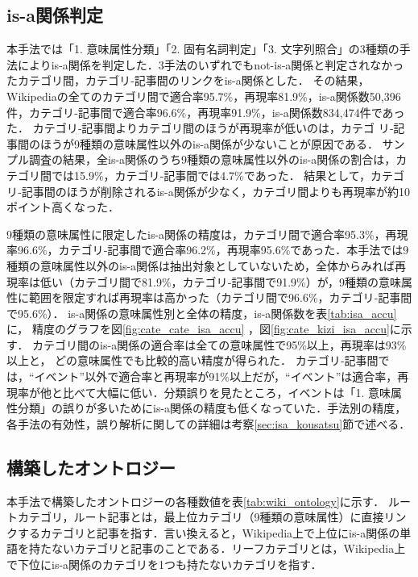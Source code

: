 \documentclass[japanese]{jnlp_1.4}
\begin{document}
\subsection{is-a関係判定}
\label{sec:isa_kekka}

本手法では「1. 意味属性分類」「2. 固有名詞判定」「3. 文字列照合」の3種類の手法によりis-a関係を判定した．3手法のいずれでもnot-is-a関係と判定されなかったカテゴリ間，カテゴリ‐記事間のリンクをis-a関係とした．
その結果，Wikipediaの全てのカテゴリ間で適合率95.7\%，再現率81.9\%，is-a関係数50,396件，カテゴリ‐記事間で適合率96.6\%，再現率91.9\%，is-a関係数834,474件であった．
カテゴリ‐記事間よりカテゴリ間のほうが再現率が低いのは，カテゴ\linebreak
リ‐記事間のほうが9種類の意味属性以外のis-a関係が少ないことが原因である．
サンプル調査の結果，全is-a関係のうち9種類の意味属性以外のis-a関係の割合は，カテゴリ間では15.9\%，カテゴリ‐記事間では4.7\%であった．
結果として，カテゴリ‐記事間のほうが削除されるis-a関係が少なく，カテゴリ間よりも再現率が約10ポイント高くなった．

9種類の意味属性に限定したis-a関係の精度は，カテゴリ間で適合率95.3\%，再現率96.6\%，カテゴリ‐記事間で適合率96.2\%，再現率95.6\%であった．本手法では9種類の意味属性以外のis-a関係は抽出対象としていないため，全体からみれば再現率は低い（カテゴリ間で81.9\%，カテゴリ‐記事間で91.9\%）が，9種類の意味属性に範囲を限定すれば再現率は高かった（カテゴリ間で96.6\%，カテゴリ‐記事間で95.6\%）．
is-a関係の意味属性別と全体の精度，is-a関係数を表\ref{tab:isa_accu}に，
精度のグラフを図\ref{fig:cate_cate_isa_accu}
，図\ref{fig:cate_kizi_isa_accu}に示す．
カテゴリ間のis-a関係の適合率は全ての意味属性で95\%以上，再現率は93\%以上と，
どの意味属性でも比較的高い精度が得られた．
カテゴリ‐記事間では，``イベント''以外で適合率と再現率が91\%以上だが，``イベント''は適合率，再現率が他と比べて大幅に低い．分類誤りを見たところ，イベントは「1. 意味属性分類」の誤りが多いためにis-a関係の精度も低くなっていた．手法別の精度，各手法の有効性，誤り解析に関しての詳細は考察\ref{sec:isa_kousatsu}節で述べる．



\subsection{構築したオントロジー}
\label{sec:constructed_onto}

本手法で構築したオントロジーの各種数値を表\ref{tab:wiki_ontology}に示す．
ルートカテゴリ，ルート記事とは，最上位カテゴリ（9種類の意味属性）に直接リンクするカテゴリと記事を指す．言い換えると，Wikipedia上で上位にis-a関係の単語を持たないカテゴリと記事のことである．リーフカテゴリとは，Wikipedia上で下位にis-a関係のカテゴリを1つも持たないカテゴリを指す．
\end{document}
